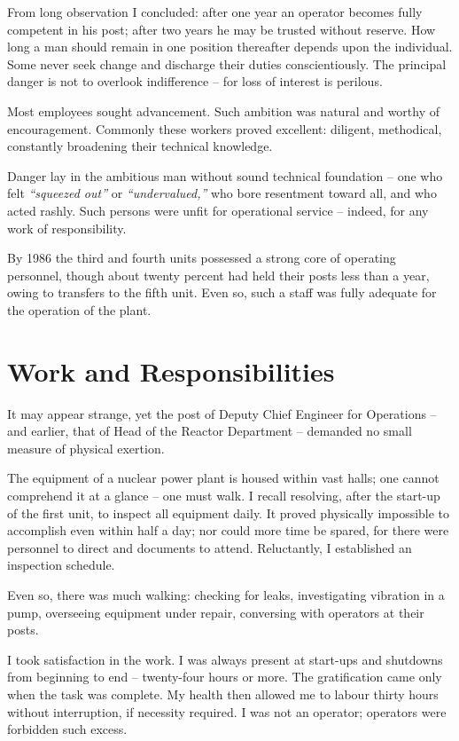 \documentclass[openright]{bookest}
\begin{document}
From long observation I concluded: after one year an operator becomes fully competent in his post; after two years he may be trusted without reserve. How long a man should remain in one position thereafter depends upon the individual. Some never seek change and discharge their duties conscientiously. The principal danger is not to overlook indifference -- for loss of interest is perilous.

Most employees sought advancement. Such ambition was natural and worthy of encouragement. Commonly these workers proved excellent: diligent, methodical, constantly broadening their technical knowledge.

Danger lay in the ambitious man without sound technical foundation -- one who felt \textit{``squeezed out''} or \textit{``undervalued,''} who bore resentment toward all, and who acted rashly. Such persons were unfit for operational service -- indeed, for any work of responsibility.

By 1986 the third and fourth units possessed a strong core of operating personnel, though about twenty percent had held their posts less than a year, owing to transfers to the fifth unit. Even so, such a staff was fully adequate for the operation of the plant.

\section{Work and Responsibilities}

It may appear strange, yet the post of Deputy Chief Engineer for Operations -- and earlier, that of Head of the Reactor Department -- demanded no small measure of physical exertion.

The equipment of a nuclear power plant is housed within vast halls; one cannot comprehend it at a glance -- one must walk. I recall resolving, after the start-up of the first unit, to inspect all equipment daily. It proved physically impossible to accomplish even within half a day; nor could more time be spared, for there were personnel to direct and documents to attend. Reluctantly, I established an inspection schedule.

Even so, there was much walking: checking for leaks, investigating vibration in a pump, overseeing equipment under repair, conversing with operators at their posts.

I took satisfaction in the work. I was always present at start-ups and shutdowns from beginning to end -- twenty-four hours or more. The gratification came only when the task was complete. My health then allowed me to labour thirty hours without interruption, if necessity required. I was not an operator; operators were forbidden such excess.
\end{document}

